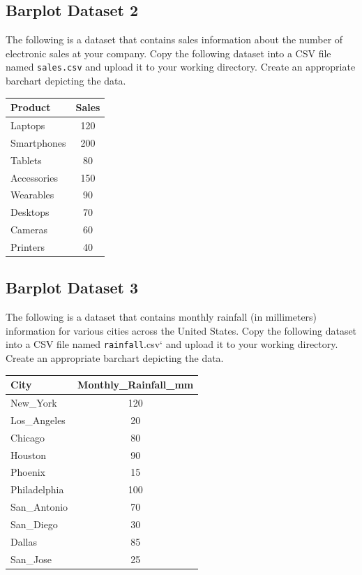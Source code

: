 \documentclass[
  letterpaper,
  DIV=11,
  numbers=noendperiod]{scrreprt}
\begin{document}
\subsection*{Barplot Dataset 2}\label{barplot-dataset-2}

The following is a dataset that contains sales information about the
number of electronic sales at your company. Copy the following dataset
into a CSV file named \texttt{sales.csv} and upload it to your working
directory. Create an appropriate barchart depicting the data.

\begin{longtable}[]{@{}lc@{}}
\toprule\noalign{}
Product & Sales \\
\midrule\noalign{}
\endhead
\bottomrule\noalign{}
\endlastfoot
Laptops & 120 \\
Smartphones & 200 \\
Tablets & 80 \\
Accessories & 150 \\
Wearables & 90 \\
Desktops & 70 \\
Cameras & 60 \\
Printers & 40 \\
\end{longtable}

\subsection*{Barplot Dataset 3}\label{barplot-dataset-3}

The following is a dataset that contains monthly rainfall (in
millimeters) information for various cities across the United States.
Copy the following dataset into a CSV file named \texttt{rainfall}.csv`
and upload it to your working directory. Create an appropriate barchart
depicting the data.

\begin{longtable}[]{@{}lc@{}}
\toprule\noalign{}
City & Monthly\_Rainfall\_mm \\
\midrule\noalign{}
\endhead
\bottomrule\noalign{}
\endlastfoot
New\_York & 120 \\
Los\_Angeles & 20 \\
Chicago & 80 \\
Houston & 90 \\
Phoenix & 15 \\
Philadelphia & 100 \\
San\_Antonio & 70 \\
San\_Diego & 30 \\
Dallas & 85 \\
San\_Jose & 25 \\
\end{longtable}
\end{document}
